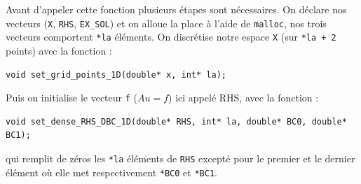\documentclass{article}
\begin{document}
Avant d'appeler cette fonction plusieurs étapes sont nécessaires. On déclare nos vecteurs (\texttt{X}, \texttt{RHS}, \texttt{EX\_SOL}) et on alloue la place à l'aide de \texttt{malloc}, nos trois vecteurs comportent \texttt{*la} éléments. On discrétise notre espace \texttt{X} (sur \texttt{*la + 2} points) avec la fonction :
\begin{scriptsize}
\begin{verbatim}
void set_grid_points_1D(double* x, int* la);
\end{verbatim}
\end{scriptsize}
Puis on initialise le vecteur \texttt{f} ($Au = f$) ici appelé RHS, avec la fonction : \begin{scriptsize}
\begin{verbatim}
void set_dense_RHS_DBC_1D(double* RHS, int* la, double* BC0, double* BC1);
\end{verbatim}
\end{scriptsize}
qui remplit de zéros les \texttt{*la} éléments de \texttt{RHS} excepté pour le premier et le dernier élément où elle met respectivement \texttt{*BC0} et \texttt{*BC1}.
\end{document}
